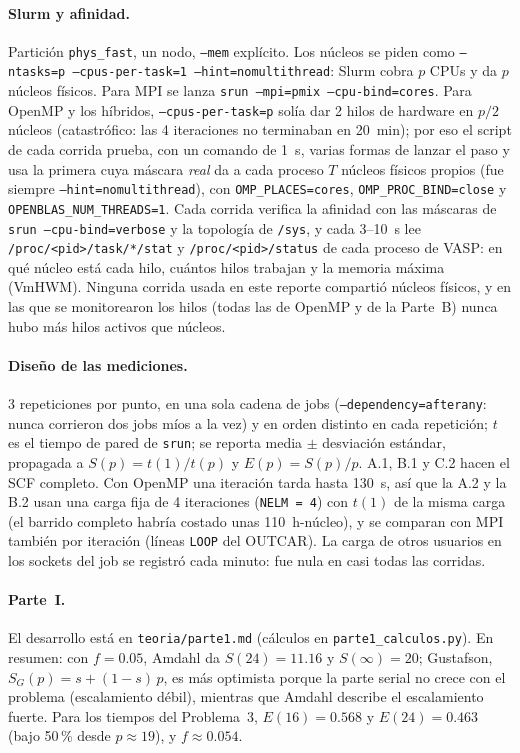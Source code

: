 \documentclass[11pt,a4paper]{article}
\newcommand{\cod}[1]{\texttt{#1}}
\begin{document}
\paragraph{Slurm y afinidad.} Partición \cod{phys\_fast}, un nodo, \cod{--mem} explícito.
Los núcleos se piden como \cod{--ntasks=p --cpus-per-task=1 --hint=nomultithread}: Slurm cobra $p$ CPUs
y da $p$ núcleos físicos. Para MPI se lanza \cod{srun --mpi=pmix --cpu-bind=cores}. Para OpenMP y los
híbridos, \cod{--cpus-per-task=p} solía dar 2 hilos de hardware en $p/2$ núcleos (catastrófico: las 4
iteraciones no terminaban en 20~min); por eso el script de cada corrida prueba, con un comando de 1~s, varias
formas de lanzar el paso y usa la primera cuya máscara \emph{real} da a cada proceso $T$ núcleos físicos
propios (fue siempre \cod{--hint=nomultithread}), con \cod{OMP\_PLACES=cores},
\cod{OMP\_PROC\_BIND=close} y \cod{OPENBLAS\_NUM\_THREADS=1}. Cada corrida verifica la afinidad con las
máscaras de \cod{srun --cpu-bind=verbose} y la topología de \cod{/sys}, y cada 3--10~s lee
\cod{/proc/<pid>/task/*/stat} y \cod{/proc/<pid>/status} de cada proceso de VASP: en qué núcleo está cada
hilo, cuántos hilos trabajan y la memoria máxima (VmHWM). Ninguna corrida usada en este reporte compartió
núcleos físicos, y en las que se monitorearon los hilos (todas las de OpenMP y de la Parte~B) nunca hubo más
hilos activos que núcleos.

\paragraph{Diseño de las mediciones.} 3 repeticiones por punto, en una sola cadena de jobs
(\cod{--dependency=afterany}: nunca corrieron dos jobs míos a la vez) y en orden distinto en cada
repetición; $t$ es el tiempo de pared de \cod{srun}; se reporta media $\pm$ desviación estándar, propagada a
$S(p)=t(1)/t(p)$ y $E(p)=S(p)/p$. A.1, B.1 y C.2 hacen el SCF completo. Con OpenMP una iteración tarda
hasta 130~s, así que la A.2 y la B.2 usan una carga fija de 4 iteraciones (\cod{NELM = 4}) con $t(1)$ de la
misma carga (el barrido completo habría costado unas 110~h-núcleo), y se comparan con MPI también por
iteración (líneas \cod{LOOP} del OUTCAR). La carga de otros usuarios en los sockets del job se registró cada
minuto: fue nula en casi todas las corridas.

\paragraph{Parte~I.} El desarrollo está en \cod{teoria/parte1.md} (cálculos en \cod{parte1\_calculos.py}).
En resumen: con $f=0.05$, Amdahl da $S(24)=11.16$ y $S(\infty)=20$; Gustafson, $S_G(p)=s+(1-s)\,p$, es más
optimista porque la parte serial no crece con el problema (escalamiento débil), mientras que Amdahl describe
el escalamiento fuerte. Para los tiempos del Problema~3, $E(16)=0.568$ y $E(24)=0.463$ (bajo 50\,\% desde
$p\approx19$), y $f\approx0.054$.
\end{document}
